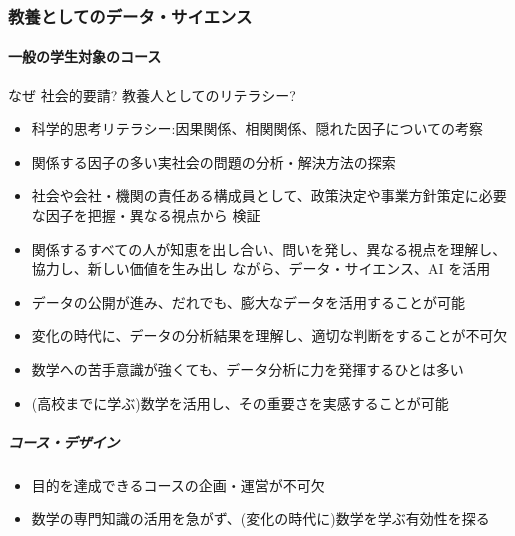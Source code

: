 \documentclass[
]{bxjsbook}
\providecommand{\tightlist}{%
  \setlength{\itemsep}{0pt}\setlength{\parskip}{0pt}}
\theoremstyle{definition}
\theoremstyle{definition}
\theoremstyle{definition}
\theoremstyle{definition}
\theoremstyle{remark}
\begin{document}
\hypertarget{ux6559ux990aux3068ux3057ux3066ux306eux30c7ux30fcux30bfux30b5ux30a4ux30a8ux30f3ux30b9}{%
\subsubsection{教養としてのデータ・サイエンス}\label{ux6559ux990aux3068ux3057ux3066ux306eux30c7ux30fcux30bfux30b5ux30a4ux30a8ux30f3ux30b9}}

\hypertarget{ux4e00ux822cux306eux5b66ux751fux5bfeux8c61ux306eux30b3ux30fcux30b9}{%
\paragraph{一般の学生対象のコース}\label{ux4e00ux822cux306eux5b66ux751fux5bfeux8c61ux306eux30b3ux30fcux30b9}}

なぜ 社会的要請? 教養人としてのリテラシー?

\begin{itemize}
\tightlist
\item
  科学的思考リテラシー:因果関係、相関関係、隠れた因子についての考察
\item
  関係する因子の多い実社会の問題の分析・解決方法の探索
\item
  社会や会社・機関の責任ある構成員として、政策決定や事業方針策定に必要な因子を把握・異なる視点から 検証
\item
  関係するすべての人が知恵を出し合い、問いを発し、異なる視点を理解し、協力し、新しい価値を生み出し ながら、データ・サイエンス、AI を活用
\item
  データの公開が進み、だれでも、膨大なデータを活用することが可能
\item
  変化の時代に、データの分析結果を理解し、適切な判断をすることが不可欠
\item
  数学への苦手意識が強くても、データ分析に力を発揮するひとは多い
\item
  (高校までに学ぶ)数学を活用し、その重要さを実感することが可能
\end{itemize}

\hypertarget{ux30b3ux30fcux30b9ux30c7ux30b6ux30a4ux30f3}{%
\subparagraph{コース・デザイン}\label{ux30b3ux30fcux30b9ux30c7ux30b6ux30a4ux30f3}}

\begin{itemize}
\tightlist
\item
  目的を達成できるコースの企画・運営が不可欠
\item
  数学の専門知識の活用を急がず、(変化の時代に)数学を学ぶ有効性を探る
\end{itemize}
\end{document}

